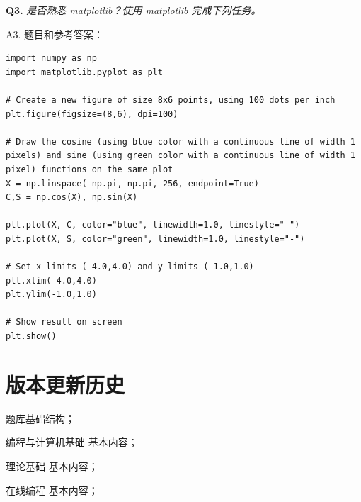 \documentclass[cn,10pt,math=newtx,citestyle=gb7714-2015,bibstyle=gb7714-2015]{elegantbook}
\begin{document}
\textbf{Q3.} \textit{是否熟悉 matplotlib？使用 matplotlib 完成下列任务。}

A3. 题目和参考答案：


\begin{lstlisting}
import numpy as np
import matplotlib.pyplot as plt

# Create a new figure of size 8x6 points, using 100 dots per inch
plt.figure(figsize=(8,6), dpi=100)

# Draw the cosine (using blue color with a continuous line of width 1 pixels) and sine (using green color with a continuous line of width 1 pixel) functions on the same plot
X = np.linspace(-np.pi, np.pi, 256, endpoint=True)
C,S = np.cos(X), np.sin(X)

plt.plot(X, C, color="blue", linewidth=1.0, linestyle="-")
plt.plot(X, S, color="green", linewidth=1.0, linestyle="-")

# Set x limits (-4.0,4.0) and y limits (-1.0,1.0)
plt.xlim(-4.0,4.0)
plt.ylim(-1.0,1.0)

# Show result on screen
plt.show()
\end{lstlisting}

\newpage

\chapter{版本更新历史}


\begin{change}
  \item 题库基础结构；
  \item 编程与计算机基础 基本内容；
  \item 理论基础 基本内容；
  \item 在线编程 基本内容；
\end{change}
\end{document}
